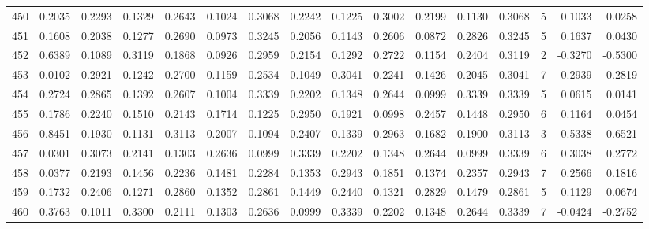 \begin{tabular}{lrrrrrrrrrrrrrrr}
450 &      0.2035 &  0.2293 &  0.1329 &  0.2643 &  0.1024 &  0.3068 &  0.2242 &  0.1225 &  0.3002 &  0.2199 &   0.1130 &     0.3068 &      5 &                    0.1033 &                     0.0258 \\
451 &      0.1608 &  0.2038 &  0.1277 &  0.2690 &  0.0973 &  0.3245 &  0.2056 &  0.1143 &  0.2606 &  0.0872 &   0.2826 &     0.3245 &      5 &                    0.1637 &                     0.0430 \\
452 &      0.6389 &  0.1089 &  0.3119 &  0.1868 &  0.0926 &  0.2959 &  0.2154 &  0.1292 &  0.2722 &  0.1154 &   0.2404 &     0.3119 &      2 &                   -0.3270 &                    -0.5300 \\
453 &      0.0102 &  0.2921 &  0.1242 &  0.2700 &  0.1159 &  0.2534 &  0.1049 &  0.3041 &  0.2241 &  0.1426 &   0.2045 &     0.3041 &      7 &                    0.2939 &                     0.2819 \\
454 &      0.2724 &  0.2865 &  0.1392 &  0.2607 &  0.1004 &  0.3339 &  0.2202 &  0.1348 &  0.2644 &  0.0999 &   0.3339 &     0.3339 &      5 &                    0.0615 &                     0.0141 \\
455 &      0.1786 &  0.2240 &  0.1510 &  0.2143 &  0.1714 &  0.1225 &  0.2950 &  0.1921 &  0.0998 &  0.2457 &   0.1448 &     0.2950 &      6 &                    0.1164 &                     0.0454 \\
456 &      0.8451 &  0.1930 &  0.1131 &  0.3113 &  0.2007 &  0.1094 &  0.2407 &  0.1339 &  0.2963 &  0.1682 &   0.1900 &     0.3113 &      3 &                   -0.5338 &                    -0.6521 \\
457 &      0.0301 &  0.3073 &  0.2141 &  0.1303 &  0.2636 &  0.0999 &  0.3339 &  0.2202 &  0.1348 &  0.2644 &   0.0999 &     0.3339 &      6 &                    0.3038 &                     0.2772 \\
458 &      0.0377 &  0.2193 &  0.1456 &  0.2236 &  0.1481 &  0.2284 &  0.1353 &  0.2943 &  0.1851 &  0.1374 &   0.2357 &     0.2943 &      7 &                    0.2566 &                     0.1816 \\
459 &      0.1732 &  0.2406 &  0.1271 &  0.2860 &  0.1352 &  0.2861 &  0.1449 &  0.2440 &  0.1321 &  0.2829 &   0.1479 &     0.2861 &      5 &                    0.1129 &                     0.0674 \\
460 &      0.3763 &  0.1011 &  0.3300 &  0.2111 &  0.1303 &  0.2636 &  0.0999 &  0.3339 &  0.2202 &  0.1348 &   0.2644 &     0.3339 &      7 &                   -0.0424 &                    -0.2752 \\

\end{tabular}
